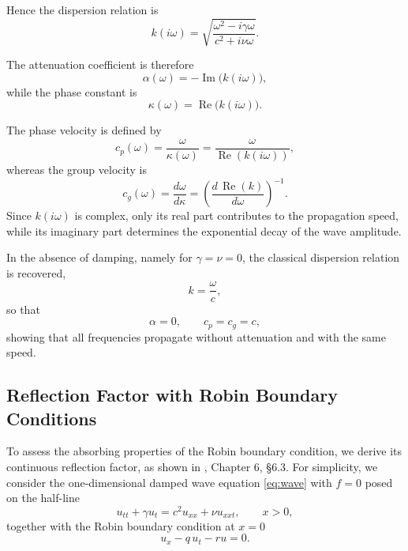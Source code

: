 \documentclass{Configuration_Files/PoliMi3i_thesis}
\begin{document}
Hence the dispersion relation is
\begin{equation*}
k(i\omega)
=
\sqrt{
\frac{\omega^2-i\gamma\omega}
     {c^2+i\nu\omega}
}.
\end{equation*}

The attenuation coefficient is therefore
\begin{equation*}
\alpha(\omega)
=
-\operatorname{Im}\!\bigl(k(i\omega)\bigr),
\end{equation*}
while the phase constant is
\begin{equation*}
\kappa(\omega)
=
\operatorname{Re}\!\bigl(k(i\omega)\bigr).
\end{equation*}

The phase velocity is defined by
\begin{equation*}
c_p(\omega)
=
\frac{\omega}{\kappa(\omega)}
=
\frac{\omega}
{\operatorname{Re}(k(i\omega))},
\end{equation*}
whereas the group velocity is
\begin{equation*}
c_g(\omega)
=
\frac{d\omega}{d\kappa}
=
\left(
\frac{d\,\operatorname{Re}(k)}
     {d\omega}
\right)^{-1}.
\end{equation*}
Since \(k(i\omega)\) is complex, only its real part contributes to the propagation speed, while its imaginary part determines the exponential decay of the wave amplitude.

In the absence of damping, namely for \(\gamma=\nu=0\), the classical dispersion relation is recovered,
\begin{equation*}
k=\frac{\omega}{c},
\end{equation*}
so that
\begin{equation*}
\alpha=0,
\qquad
c_p=c_g=c,
\end{equation*}
showing that all frequencies propagate without attenuation and with the same speed.

\subsection{Reflection Factor with Robin Boundary Conditions}
To assess the absorbing properties of the Robin boundary condition, we derive its continuous reflection factor, as shown in \cite{kuttruff_acoustics_2007}, Chapter 6, §6.3. For simplicity, we consider the one-dimensional damped wave equation \eqref{eq:wave} with \(f=0\) posed on the half-line
\begin{equation*}
u_{tt}
+\gamma u_t
=
c^2u_{xx}
+\nu u_{xxt},
\qquad
x>0,
\end{equation*}
together with the Robin boundary condition at $x=0$
\begin{equation*}
u_x-q\,u_t-ru=0.
\end{equation*}
\end{document}
